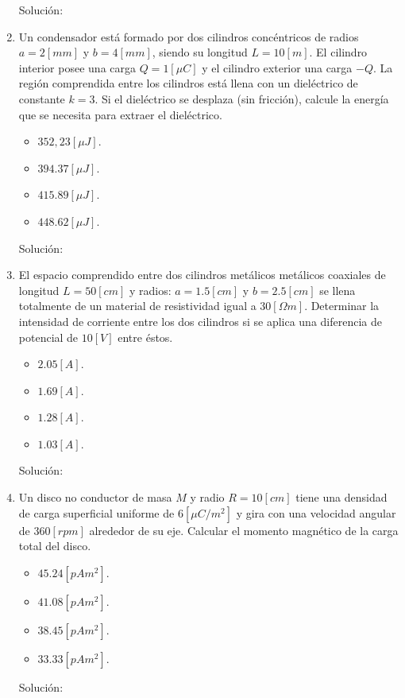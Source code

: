 \documentclass[letter,11pt]{article}
\begin{document}
\begin{enumerate}
Solución: \\

\item Un condensador está formado por dos cilindros concéntricos de radios
$a = 2 [mm]$ y $b = 4 [mm]$, siendo su longitud $L = 10 [m]$. El cilindro
interior posee una carga $Q =1 [\mu C]$ y el cilindro exterior una carga $-Q$.
La región comprendida entre los cilindros está llena con un dieléctrico de
constante $k = 3$. Si el dieléctrico se desplaza (sin fricción), calcule la
energía que se necesita para extraer el dieléctrico.

\begin{itemize}
    \item $352,23 [\mu J]$.
    \item $394.37 [\mu J]$.
    \item $415.89 [\mu J]$.
    \item $448.62 [\mu J]$.
\end{itemize}

Solución: \\

\item El espacio comprendido entre dos cilindros metálicos metálicos coaxiales
de longitud $L = 50 [cm]$ y radios: $a = 1.5 [cm]$ y $b = 2.5 [cm]$ se llena
totalmente de un material de resistividad igual a $30 [\Omega m]$. Determinar la
intensidad de corriente entre los dos cilindros si se aplica una diferencia de
potencial de $10 [V]$ entre éstos.

\begin{itemize}
    \item $2.05 [A]$.
    \item $1.69 [A]$.
    \item $1.28 [A]$.
    \item $1.03 [A]$.
\end{itemize}

Solución: \\

\item Un disco no conductor de masa $M$ y radio $R = 10 [cm]$ tiene una densidad
de carga superficial uniforme de $6 [\mu C/m^2]$ y gira con una velocidad
angular de $360 [rpm]$ alrededor de su eje. Calcular el momento magnético de la
carga total del disco.

\begin{itemize}
    \item $45.24 [pA m^2]$.
    \item $41.08 [pA m^2]$.
    \item $38.45 [pA m^2]$.
    \item $33.33 [pA m^2]$.
\end{itemize}

Solución: \\

\end{enumerate}
\end{document}
